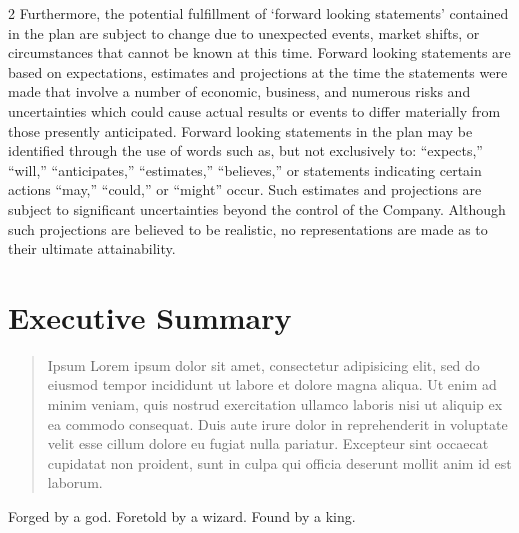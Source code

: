 \documentclass[9pt,]{book}
\begin{document}
\begin {multicols}{2}
Furthermore, the potential fulfillment of `forward looking statements'
contained in the plan are subject to change due to unexpected events,
market shifts, or circumstances that cannot be known at this time.
Forward looking statements are based on expectations, estimates and
projections at the time the statements were made that involve a number
of economic, business, and numerous risks and uncertainties which could
cause actual results or events to differ materially from those presently
anticipated. Forward looking statements in the plan may be identified
through the use of words such as, but not exclusively to: ``expects,''
``will,'' ``anticipates,'' ``estimates,'' ``believes,'' or statements
indicating certain actions ``may,'' ``could,'' or ``might'' occur. Such
estimates and projections are subject to significant uncertainties
beyond the control of the Company. Although such projections are
believed to be realistic, no representations are made as to their
ultimate attainability.

\end {multicols}

\chapter*{Executive Summary}

\begin{quote}
Ipsum Lorem ipsum dolor sit amet, consectetur adipisicing elit, sed do
eiusmod tempor incididunt ut labore et dolore magna aliqua. Ut enim ad
minim veniam, quis nostrud exercitation ullamco laboris nisi ut aliquip
ex ea commodo consequat. Duis aute irure dolor in reprehenderit in
voluptate velit esse cillum dolore eu fugiat nulla pariatur. Excepteur
sint occaecat cupidatat non proident, sunt in culpa qui officia deserunt
mollit anim id est laborum.
\end{quote}

Forged by a god. Foretold by a wizard. Found by a king.
\end{document}
